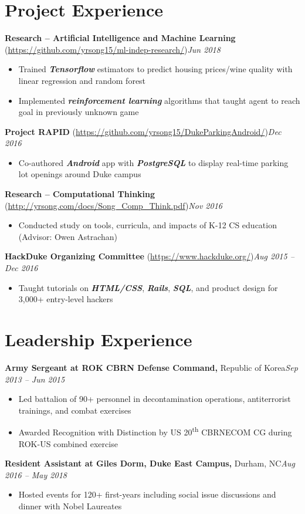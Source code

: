 \documentclass[11pt,letterpaper]{article}
\newcommand{\entry}[3]{\textbf{#1}#2\hfill\textit{#3}\par}
\newcommand{\entryurl}[3]{\textbf{#1} {\scriptsize(\url{#2})}\hfill\textit{#3}\par}
\newcommand{\kw}[1]{\textbf{\textit{#1}}}
\begin{document}
\section*{Project Experience}
\entryurl{Research -- Artificial Intelligence and Machine Learning}{https://github.com/yrsong15/ml-indep-research/}{Jun 2018}
\begin{itemize}
  \item Trained \kw{Tensorflow} estimators to predict housing prices/wine quality with linear regression and random forest
  \item Implemented \kw{reinforcement learning} algorithms that taught agent to reach goal in previously unknown game
\end{itemize}
\entryurl{Project RAPID}{https://github.com/yrsong15/DukeParkingAndroid/}{Dec 2016}
\begin{itemize}
  \item Co-authored \kw{Android} app with \kw{PostgreSQL} to display real-time parking lot openings around Duke campus
\end{itemize}
\entryurl{Research -- Computational Thinking}{http://yrsong.com/docs/Song_Comp_Think.pdf}{Nov 2016}
\begin{itemize}
  \item Conducted study on tools, curricula, and impacts of K-12 CS education (Advisor: Owen Astrachan)
\end{itemize}
\entryurl{HackDuke Organizing Committee}{https://www.hackduke.org/}{Aug 2015 -- Dec 2016}
\begin{itemize}
  \item Taught tutorials on \kw{HTML/CSS}, \kw{Rails}, \kw{SQL}, and product design for 3,000+ entry-level hackers
\end{itemize}

\section*{Leadership Experience}
\entry{Army Sergeant at ROK CBRN Defense Command,}{ Republic of Korea}{Sep 2013 -- Jun 2015}
\begin{itemize}
  \item Led battalion of 90+ personnel in decontamination operations, antiterrorist trainings, and combat exercises
  \item Awarded Recognition with Distinction by US 20\textsuperscript{th} CBRNECOM CG during ROK-US combined exercise
\end{itemize}
\entry{Resident Assistant at Giles Dorm, Duke East Campus,}{ Durham, NC}{Aug 2016 -- May 2018}
\begin{itemize}
  \item Hosted events for 120+ first-years including social issue discussions and dinner with Nobel Laureates
\end{itemize}
\end{document}
